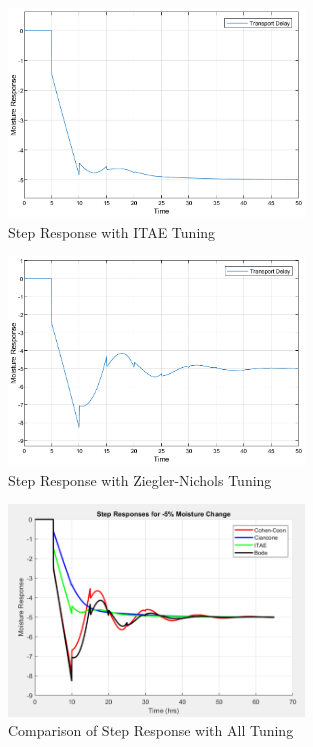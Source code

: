 \documentclass[12pt]{article}
\begin{document}
\begin{enumerate}
\begin{enumerate}
    \begin{figure}[H]
      \centering
      \includegraphics[width=0.7\textwidth]{Figures/figure2-3c.png}
      \caption{Step Response with ITAE Tuning}
      \label{fig:figure2_3c}
    \end{figure}

    \begin{figure}[H]
      \centering
      \includegraphics[width=0.7\textwidth]{Figures/figure2-3d.png}
      \caption{Step Response with Ziegler-Nichols Tuning}
      \label{fig:figure2_3d}
    \end{figure}

    \begin{figure}[H]
      \centering
      \includegraphics[width=0.7\textwidth]{Figures/figure2-3e.png}
      \caption{Comparison of Step Response with All Tuning}
      \label{fig:figure2_3e}
    \end{figure}


\end{enumerate}
\end{enumerate}
\end{document}
